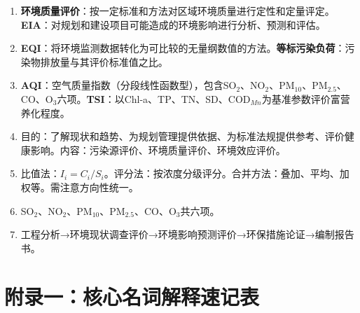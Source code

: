 \documentclass[10pt,a4paper,oneside]{ctexbook}
\begin{document}
\begin{enumerate}[leftmargin=*, itemsep=5pt]
    \item \textbf{环境质量评价}：按一定标准和方法对区域环境质量进行定性和定量评定。\textbf{EIA}：对规划和建设项目可能造成的环境影响进行分析、预测和评估。

    \item \textbf{EQI}：将环境监测数据转化为可比较的无量纲数值的方法。\textbf{等标污染负荷}：污染物排放量与其评价标准值之比。

    \item \textbf{AQI}：空气质量指数（分段线性函数型），包含SO$_2$、NO$_2$、PM$_{10}$、PM$_{2.5}$、CO、O$_3$六项。\textbf{TSI}：以Chl-a、TP、TN、SD、COD$_{Mn}$为基准参数评价富营养化程度。

    \item 目的：了解现状和趋势、为规划管理提供依据、为标准法规提供参考、评价健康影响。内容：污染源评价、环境质量评价、环境效应评价。

    \item 比值法：$I_i=C_i/S_i$。评分法：按浓度分级评分。合并方法：叠加、平均、加权等。需注意方向性统一。

    \item SO$_2$、NO$_2$、PM$_{10}$、PM$_{2.5}$、CO、O$_3$共六项。

    \item 工程分析→环境现状调查评价→环境影响预测评价→环保措施论证→编制报告书。
\end{enumerate}

\newpage

\chapter*{附录一：核心名词解释速记表}
\end{document}

